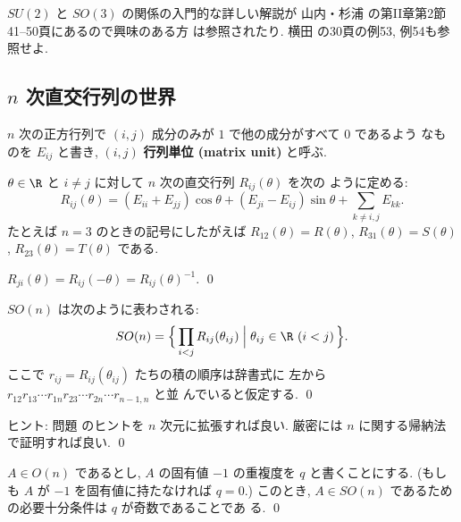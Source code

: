 \documentclass[12pt,twoside]{jarticle}
\begin{document}
\bigskip

$SU(2)$ と $SO(3)$ の関係の入門的な詳しい解説が
山内・杉浦 \cite{renzokugunron} の第II章第2節41--50頁にあるので興味のある方
は参照されたり.  横田 \cite{gun-iso} の30頁の例53, 例54も参照せよ.


\subsection{$n$ 次直交行列の世界}
\label{sec:O(n)}

$n$ 次の正方行列で $(i,j)$ 成分のみが $1$ で他の成分がすべて $0$ であるよう
なものを $E_{ij}$ と書き, $(i,j)$ {\bf 行列単位 (matrix unit)} と呼ぶ.

$\theta\in\R$ と $i\ne j$ に対して $n$ 次の直交行列 $R_{ij}(\theta)$ を次の
ように定める:
\begin{equation*}
  R_{ij}(\theta) 
  = (E_{ii}+E_{jj})\cos\theta
  + (E_{ji}-E_{ij})\sin\theta
  + \sum_{k\ne i,j} E_{kk}.
\end{equation*}
たとえば $n=3$ のときの記号にしたがえば %
$R_{12}(\theta)=R(\theta)$,
$R_{31}(\theta)=S(\theta)$,
$R_{23}(\theta)=T(\theta)$ である.  

\begin{question}
  $R_{ji}(\theta)=R_{ij}(-\theta)=R_{ij}(\theta)^{-1}$. \qed
\end{question}


\begin{question}
\label{q:SO(n)=R...R}
  $SO(n)$ は次のように表わされる:
  \begin{equation*}
    SO(n) =
    \Bigl\{\, 
      \prod_{i<j}R_{ij}(\theta_{ij})
    \Bigm|
      \theta_{ij}\in\R\ (i<j)
    \,\Bigr\}.
  \end{equation*}
  ここで $r_{ij}=R_{ij}(\theta_{ij})$ たちの積の順序は辞書式に
  左から $r_{12}r_{13}\cdots r_{1n}r_{23}\cdots r_{2n}\cdots r_{n-1,n}$ と並
  んでいると仮定する. \qed
\end{question}

\noindent
ヒント: 問題  のヒントを $n$ 次元に拡張すれば良い.
厳密には $n$ に関する帰納法で証明すれば良い.
\qed


\begin{question}
\label{q:pre-SO(n)-connected}
  $A\in O(n)$ であるとし, $A$ の固有値 $-1$ の重複度を $q$ と書くことにする.
  (もしも $A$ が $-1$ を固有値に持たなければ $q=0$.)
  このとき, $A\in SO(n)$ であるための必要十分条件は $q$ が奇数であることであ
  る. \qed
\end{question}
\end{document}
